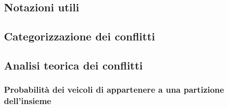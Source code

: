 \documentclass[../main.tex]{subfiles}
\begin{document}
\subsection{Notazioni utili}


\subsection{Categorizzazione dei conflitti}


\subsection{Analisi teorica dei conflitti}
\subsubsection{Probabilità dei veicoli di appartenere a una partizione dell'insieme}

% 
\end{document}
